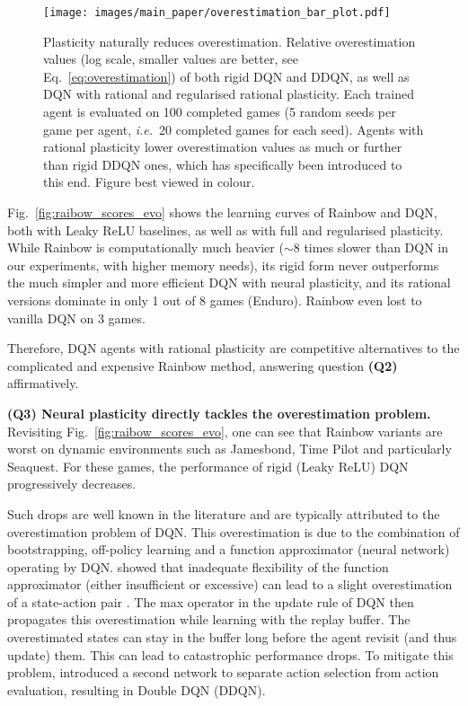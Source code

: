 \documentclass[accepted]{article}
\theoremstyle{plain}
\theoremstyle{definition}
\theoremstyle{remark}
\newcommand{\ie}{\emph{i.e.}~}
\begin{document}
\begin{figure*}[t]
    \centering
    \texttt{[image: images/main\_paper/overestimation\_bar\_plot.pdf]}
    \vspace{-0.33 cm}
    \caption{Plasticity naturally reduces overestimation. Relative overestimation values (log scale, smaller values are better, see Eq.~\ref{eq:overestimation}) of both rigid DQN and DDQN, as well as DQN with rational and regularised rational plasticity. Each trained agent is evaluated on 100 completed games (5 random seeds per game per agent, \ie 20 completed games for each seed). Agents with rational plasticity lower overestimation values as much or further than rigid DDQN ones, which has specifically been introduced to this end. Figure best viewed in colour.}
    \label{fig:overestimation_bar_plot}
\end{figure*}
Fig.~\ref{fig:raibow_scores_evo} shows the learning curves of Rainbow and DQN, both with Leaky ReLU baselines, as well as with full and regularised plasticity.
While Rainbow is computationally much heavier ($\sim 8$ times slower than DQN in our experiments, with higher memory needs), its rigid form never outperforms the much simpler and more efficient DQN with neural plasticity, and its rational versions dominate in only 1 out of 8 games (Enduro). Rainbow even lost to vanilla DQN on 3 games.

Therefore, DQN agents with rational plasticity are competitive alternatives to the complicated and expensive Rainbow method, answering question \textbf{(Q2)} affirmatively.

{\bf (Q3) Neural plasticity directly tackles the overestimation problem.}
Revisiting Fig.~\ref{fig:raibow_scores_evo}, one can see that Rainbow variants are worst on dynamic environments such as Jamesbond, Time Pilot and particularly Seaquest.
For these games, the performance of rigid (Leaky ReLU) DQN progressively decreases. 

Such drops are well known in the literature and are typically attributed to the overestimation problem of DQN. This overestimation is 
due to the combination of bootstrapping, off-policy learning and a function approximator (neural network) operating by DQN. \citeauthor{van2016deep} showed that inadequate flexibility of the function approximator (either insufficient or excessive) can lead to a slight overestimation of a state-action pair . The max operator in the update rule of DQN then propagates this overestimation while learning with the replay buffer. The overestimated states can stay in the buffer long before the agent revisit (and thus update) them. This can lead to catastrophic performance drops. To mitigate this problem, \citeauthor{van2016deep} introduced a second network to separate action selection from action evaluation, resulting in Double DQN (DDQN). 
\end{document}
